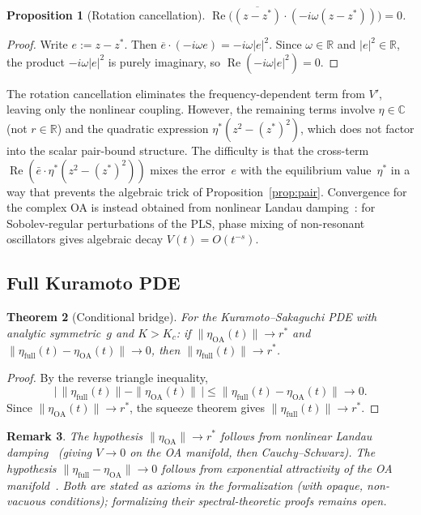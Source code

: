 \documentclass[11pt,a4paper]{article}
\newtheorem{theorem}{Theorem}[section]
\newtheorem{proposition}[theorem]{Proposition}
\newtheorem{remark}[theorem]{Remark}
\theoremstyle{definition}
\DeclareMathOperator{\re}{Re}
\newcommand{\R}{\mathbb{R}}
\newcommand{\C}{\mathbb{C}}
\begin{document}
\begin{proposition}[Rotation cancellation]\label{prop:rotation}
$\re\bigl(\overline{(z-z^*)}\cdot(-i\omega(z-z^*))\bigr) = 0$.
\end{proposition}
\begin{proof}
Write $e:=z-z^*$. Then $\overline{e}\cdot(-i\omega e) = -i\omega|e|^2$. Since $\omega\in\R$ and $|e|^2\in\R$, the product $-i\omega|e|^2$ is purely imaginary, so $\re(-i\omega|e|^2)=0$.
\end{proof}

The rotation cancellation eliminates the frequency-dependent term from $V'$, leaving only the nonlinear coupling. However, the remaining terms involve $\eta\in\C$ (not $r\in\R$) and the quadratic expression $\eta^*(z^2-(z^*)^2)$, which does not factor into the scalar pair-bound structure. The difficulty is that the cross-term $\re(\bar e\cdot\eta^*(z^2-(z^*)^2))$ mixes the error~$e$ with the equilibrium value~$\eta^*$ in a way that prevents the algebraic trick of Proposition~\ref{prop:pair}. Convergence for the complex OA is instead obtained from nonlinear Landau damping~\cite{dietert2017}: for Sobolev-regular perturbations of the PLS, phase mixing of non-resonant oscillators gives algebraic decay $V(t)=O(t^{-s})$.

\subsection{Full Kuramoto PDE}

\begin{theorem}[Conditional bridge]\label{thm:full}
For the Kuramoto--Sakaguchi PDE with analytic symmetric~$g$ and $K>K_c$: if $\|\eta_{\mathrm{OA}}(t)\|\to r^*$ and $\|\eta_{\mathrm{full}}(t)-\eta_{\mathrm{OA}}(t)\|\to 0$, then $\|\eta_{\mathrm{full}}(t)\|\to r^*$.
\end{theorem}
\begin{proof}
By the reverse triangle inequality,
\[
\bigl|\,\|\eta_{\mathrm{full}}(t)\|-\|\eta_{\mathrm{OA}}(t)\|\,\bigr| \leq \|\eta_{\mathrm{full}}(t)-\eta_{\mathrm{OA}}(t)\| \to 0.
\]
Since $\|\eta_{\mathrm{OA}}(t)\|\to r^*$, the squeeze theorem gives $\|\eta_{\mathrm{full}}(t)\|\to r^*$.
\end{proof}

\begin{remark}
The hypothesis $\|\eta_{\mathrm{OA}}\|\to r^*$ follows from nonlinear Landau damping~\cite{dietert2017} (giving $V\to 0$ on the OA manifold, then Cauchy--Schwarz). The hypothesis $\|\eta_{\mathrm{full}}-\eta_{\mathrm{OA}}\|\to 0$ follows from exponential attractivity of the OA manifold~\cite{dietert-fernandez2018}. Both are stated as axioms in the formalization (with opaque, non-vacuous conditions); formalizing their spectral-theoretic proofs remains open.
\end{remark}
\end{document}
